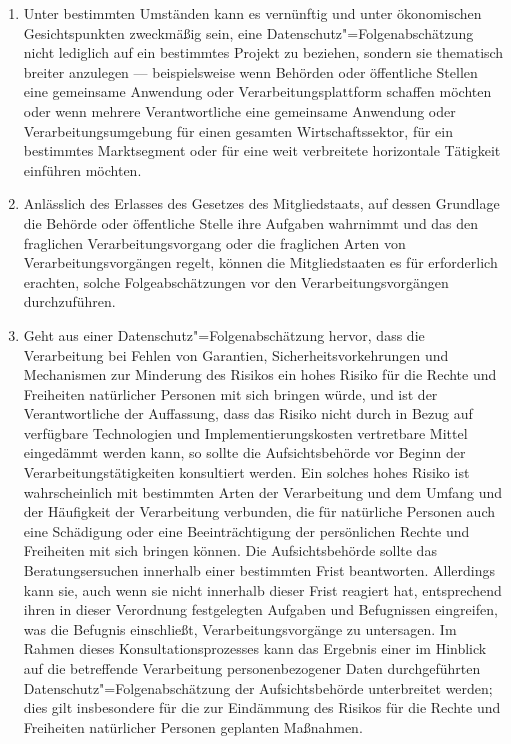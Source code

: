 \begin{enumerate}

   \item Unter bestimmten Umständen kann es vernünftig und unter ökonomischen Gesichtspunkten zweckmäßig sein, eine
    Datenschutz"=Folgenabschätzung nicht lediglich auf ein bestimmtes Projekt zu beziehen, sondern sie thematisch
    breiter anzulegen — beispielsweise wenn Behörden oder öffentliche Stellen eine gemeinsame Anwendung oder
    Verarbeitungsplattform schaffen möchten oder wenn mehrere Verantwortliche eine gemeinsame Anwendung oder
    Verarbeitungsumgebung für einen gesamten Wirtschaftssektor, für ein bestimmtes Marktsegment oder für eine weit
    verbreitete horizontale Tätigkeit einführen möchten.%
   \label{eg:92}
   

   \item Anlässlich des Erlasses des Gesetzes des Mitgliedstaats, auf dessen Grundlage die Behörde oder öffentliche
    Stelle ihre Aufgaben wahrnimmt und das den fraglichen Verarbeitungsvorgang oder die fraglichen Arten von
    Verarbeitungsvorgängen regelt, können die Mitgliedstaaten es für erforderlich erachten, solche Folgeabschätzungen
    vor den Verarbeitungsvorgängen durchzuführen.%
   \label{eg:93}
   

   \item Geht aus einer Datenschutz"=Folgenabschätzung hervor, dass die Verarbeitung bei Fehlen von Garantien,
    Sicherheitsvorkehrungen und Mechanismen zur Minderung des Risikos ein hohes Risiko für die Rechte und Freiheiten
    natürlicher Personen mit sich bringen würde, und ist der Verantwortliche der Auffassung, dass das Risiko nicht
    durch in Bezug auf verfügbare Technologien und Implementierungskosten vertretbare Mittel eingedämmt werden kann, so
    sollte die Aufsichtsbehörde vor Beginn der Verarbeitungstätigkeiten konsultiert werden. Ein solches hohes Risiko
    ist wahrscheinlich mit bestimmten Arten der Verarbeitung und dem Umfang und der Häufigkeit der Verarbeitung
    verbunden, die für natürliche Personen auch eine Schädigung oder eine Beeinträchtigung der persönlichen Rechte und
    Freiheiten mit sich bringen können. Die Aufsichtsbehörde sollte das Beratungsersuchen innerhalb einer bestimmten
    Frist beantworten. Allerdings kann sie, auch wenn sie nicht innerhalb dieser Frist reagiert hat, entsprechend ihren
    in dieser Verordnung festgelegten Aufgaben und Befugnissen eingreifen, was die Befugnis einschließt,
    Verarbeitungsvorgänge zu untersagen. Im Rahmen dieses Konsultationsprozesses kann das Ergebnis einer im Hinblick
    auf die betreffende Verarbeitung personenbezogener Daten durchgeführten Datenschutz"=Folgenabschätzung der
    Aufsichtsbehörde unterbreitet werden; dies gilt insbesondere für die zur Eindämmung des Risikos für die Rechte und
    Freiheiten natürlicher Personen geplanten Maßnahmen.%
   \label{eg:94}
   

\end{enumerate}
